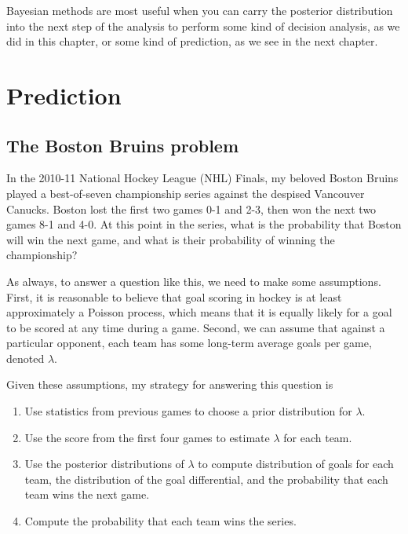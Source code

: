 \documentclass[12pt]{book}
\begin{document}
Bayesian methods are most useful when you can carry the posterior
distribution into the next step of the analysis to perform some
kind of decision analysis, as we did in this chapter, or some kind of
prediction, as we see in the next chapter.



\chapter{Prediction}
\label{prediction}

\section{The Boston Bruins problem}

In the 2010-11 National Hockey League (NHL) Finals, my beloved Boston
Bruins played a best-of-seven championship series against the despised
Vancouver Canucks.  Boston lost the first two games 0-1 and 2-3, then
won the next two games 8-1 and 4-0.  At this point in the series, what
is the probability that Boston will win the next game, and what is
their probability of winning the championship?

As always, to answer a question like this, we need to make some
assumptions.  First, it is reasonable to believe that goal scoring in
hockey is at least approximately a Poisson process, which means that
it is equally likely for a goal to be scored at any time during a
game.  Second, we can assume that against a particular opponent, each team
has some long-term average goals per game, denoted $\lambda$.

Given these assumptions, my strategy for answering this question is

\begin{enumerate}

\item Use statistics from previous games to choose a prior
distribution for $\lambda$.

\item Use the score from the first four games to estimate $\lambda$
for each team.

\item Use the posterior distributions of $\lambda$ to compute 
distribution of goals for each team, the distribution of the
goal differential, and the probability that each team wins
the next game.

\item Compute the probability that each team wins the series.

\end{enumerate}
\end{document}
